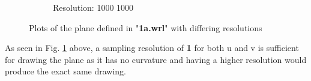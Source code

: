 \documentclass[acmlarge,nonacm=true]{acmart}
\begin{document}
\begin{figure}[H]
\begin{subfigure}{.33\textwidth}
		\caption{Resolution: 1000 1000}
	  \end{subfigure}
	\caption{Plots of the plane defined in "\textbf{1a.wrl}" with differing resolutions}
	\label{fig:1a}
\end{figure}
 
As seen in Fig. \ref{fig:1a} above, a sampling resolution of \textbf{1} for both u and v is 
sufficient for drawing the plane as it has no curvature and having a higher resolution would
produce the exact same drawing.



\newpage
\end{document}
